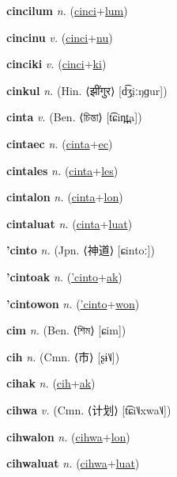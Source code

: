 \textbf{\hypertarget{cincilum}{cincilum}} \textit{n.} (\hyperlink{cinci}{cinci}+\allowbreak \hyperlink{lum}{lum})


\textbf{\hypertarget{cincinu}{cincinu}} \textit{v.} (\hyperlink{cinci}{cinci}+\allowbreak \hyperlink{nu}{nu})


\textbf{\hypertarget{cinciki}{cinciki}} \textit{v.} (\hyperlink{cinci}{cinci}+\allowbreak \hyperlink{ki}{ki})


\textbf{\hypertarget{cinkul}{cinkul}} \textit{n.} (Hin. ⟨{\devanagari{}झींगुर}⟩ [d͡ʒ̤iːŋɡur])


\textbf{\hypertarget{cinta}{cinta}} \textit{v.} (Ben. ⟨{\bengali{}চিন্তা}⟩ [t͡ɕin̪t̪a])


\textbf{\hypertarget{cintaec}{cintaec}} \textit{n.} (\hyperlink{cinta}{cinta}+\allowbreak \hyperlink{ec}{ec})


\textbf{\hypertarget{cintales}{cintales}} \textit{n.} (\hyperlink{cinta}{cinta}+\allowbreak \hyperlink{les}{les})


\textbf{\hypertarget{cintalon}{cintalon}} \textit{n.} (\hyperlink{cinta}{cinta}+\allowbreak \hyperlink{lon}{lon})


\textbf{\hypertarget{cintaluat}{cintaluat}} \textit{n.} (\hyperlink{cinta}{cinta}+\allowbreak \hyperlink{luat}{luat})


\textbf{\hypertarget{'cinto}{'cinto}} \textit{n.} (Jpn. ⟨{\japanese{}神道}⟩ [ɕintoː])


\textbf{\hypertarget{'cintoak}{'cintoak}} \textit{n.} (\hyperlink{'cinto}{'cinto}+\allowbreak \hyperlink{ak}{ak})


\textbf{\hypertarget{'cintowon}{'cintowon}} \textit{n.} (\hyperlink{'cinto}{'cinto}+\allowbreak \hyperlink{won}{won})


\textbf{\hypertarget{cim}{cim}} \textit{n.} (Ben. ⟨{\bengali{}শিম}⟩ [ɕim])


\textbf{\hypertarget{cih}{cih}} \textit{n.} (Cmn. ⟨{\chinese{}市}⟩ [ʂɨ˥˩])


\textbf{\hypertarget{cihak}{cihak}} \textit{n.} (\hyperlink{cih}{cih}+\allowbreak \hyperlink{ak}{ak})


\textbf{\hypertarget{cihwa}{cihwa}} \textit{v.} (Cmn. ⟨{\chinese{}计划}⟩ [t͡ɕi˥˩xwa˥˩])


\textbf{\hypertarget{cihwalon}{cihwalon}} \textit{n.} (\hyperlink{cihwa}{cihwa}+\allowbreak \hyperlink{lon}{lon})


\textbf{\hypertarget{cihwaluat}{cihwaluat}} \textit{n.} (\hyperlink{cihwa}{cihwa}+\allowbreak \hyperlink{luat}{luat})


